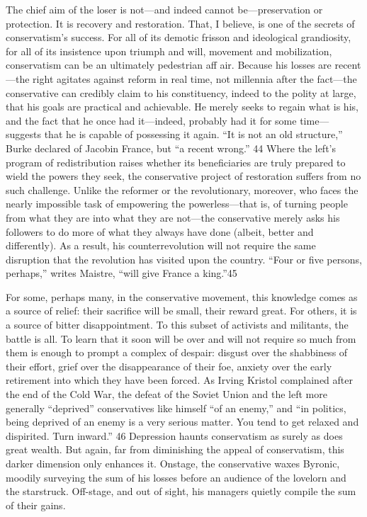 \par 
The chief aim of the loser is not—and indeed cannot be—preservation or protection. It is recovery and restoration. That, I believe, is one of the secrets of conservatism’s success. For all of its demotic frisson and ideological grandiosity, for all of its insistence upon triumph and will, movement and mobilization, conservatism can be an ultimately pedestrian aff air. Because his losses are recent—the right agitates against reform in real time, not millennia after the fact—the conservative can credibly claim to his constituency, indeed to the polity at large, that his goals are practical and achievable. He merely seeks to regain what is his, and the fact that he once had it—indeed, probably had it for some time— suggests that he is capable of possessing it again. “It is not an old structure,” Burke declared of Jacobin France, but “a recent wrong.” {\color{blue}44} Where the left’s program of redistribution raises whether its beneficiaries are truly prepared to wield the powers they seek, the conservative project of restoration suffers from no such challenge. Unlike the reformer or the revolutionary, moreover, who faces the nearly impossible task of empowering the powerless—that is, of turning people from what they are into what they are not—the conservative merely asks his followers to do more of what they always have done (albeit, better and differently). As a result, his counterrevolution will not require the same disruption that the revolution has visited upon the country. “Four or five persons, perhaps,” writes Maistre, “will give France a king.”{\color{blue}45}
 \par 
For some, perhaps many, in the conservative movement, this knowledge comes as a source of relief: their sacrifice will be small, their reward great. For others, it is a source of bitter disappointment. To this subset of activists and militants, the battle is all. To learn that it soon will be over and will not require so much from them is enough to prompt a complex of despair: disgust over the shabbiness of their effort, grief over the disappearance of their foe, anxiety over the early retirement into which they have been forced. As Irving Kristol complained after the end of the Cold War, the defeat of the Soviet Union and the left more generally “deprived” conservatives like himself “of an enemy,” and “in politics, being deprived of an enemy is a very serious matter. You tend to get relaxed and dispirited. Turn inward.” {\color{blue}46} Depression haunts conservatism as surely as does great wealth. But again, far from diminishing the appeal of conservatism, this darker dimension only enhances it. Onstage, the conservative waxes Byronic, moodily surveying the sum of his losses before an audience of the lovelorn and the starstruck. Off-stage, and out of sight, his managers quietly compile the sum of their gains.